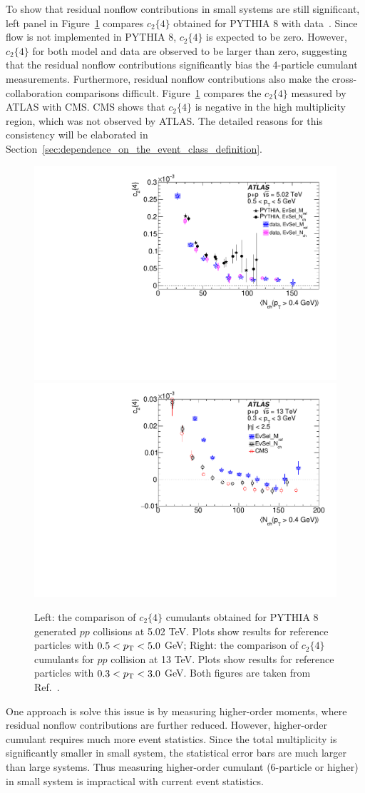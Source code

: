 To show that residual nonflow contributions in small systems are still significant, left panel in Figure~\ref{fig:subcumu_adam} compares $c_2\{4\}$ obtained for PYTHIA 8 with data~\cite{Aaboud:2017acw}. Since flow is not implemented in PYTHIA 8, $c_2\{4\}$ is expected to be zero. However, $c_2\{4\}$ for both model and data are observed to be larger than zero, suggesting that the residual nonflow contributions significantly bias the 4-particle cumulant measurements. Furthermore, residual nonflow contributions also make the cross-collaboration comparisons difficult. Figure~\ref{fig:subcumu_adam} compares the $c_2\{4\}$ measured by ATLAS with CMS. CMS shows that $c_2\{4\}$ is negative in the high multiplicity region, which was not observed by ATLAS. The detailed reasons for this consistency will be elaborated in Section~\ref{sec:dependence_on_the_event_class_definition}.

\begin{figure}[H]
\centering
\includegraphics[width=.475\linewidth]{figs/chapter_subcumu/adam_pythia.pdf}
\includegraphics[width=.475\linewidth]{figs/chapter_subcumu/adam_cms.pdf}
\caption{Left: the comparison of $c_2\{4\}$ cumulants obtained for PYTHIA 8 generated $pp$ collisions at 5.02 TeV. Plots show results for reference particles with $0.5<p_\text{T}<5.0$ GeV; Right: the comparison of $c_2\{4\}$ cumulants for $pp$ collision at 13 TeV. Plots show results for reference particles with $0.3<p_\text{T}<3.0$ GeV. Both figures are taken from Ref.~\cite{Aaboud:2017acw}.}
\label{fig:subcumu_adam}
\end{figure}

One approach is solve this issue is by measuring higher-order moments, where residual nonflow contributions are further reduced. However, higher-order cumulant requires much more event statistics. Since the total multiplicity is significantly smaller in small system, the statistical error bars are much larger than large systems. Thus measuring higher-order cumulant (6-particle or higher) in small system is impractical with current event statistics.



